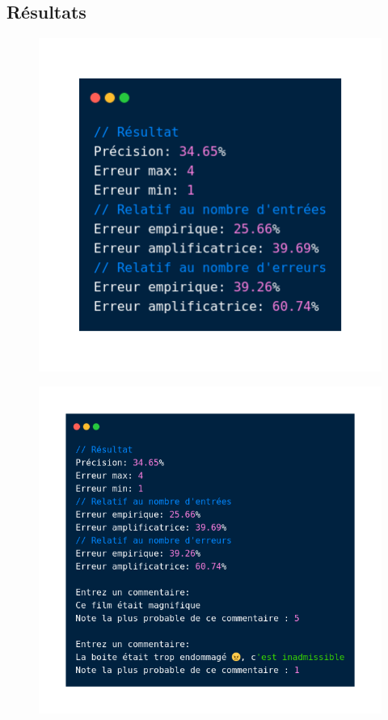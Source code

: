 \subsection{Résultats}
\begin{frame}{\subsecname}
\begin{figure}[ht]
\includegraphics[scale=.34]{img/scraping_resultat.png}
\end{figure}
\end{frame}

\begin{frame}{\subsecname}
\begin{figure}[ht]
\includegraphics[scale=.3]{img/scraping_resultat2.png}
\end{figure}
\end{frame}

